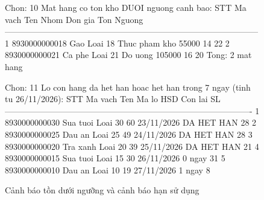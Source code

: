 \begin{figure}[htbp]
\begin{manhinh}
Chon: 10
Mat hang co ton kho DUOI nguong canh bao:
STT  Ma vach        Ten                       Nhom                 Don gia     Ton  Nguong
------------------------------------------------------------------------------------------
1    8930000000018  Gao Loai 18               Thuc pham kho          55000      14      22
2    8930000000021  Ca phe Loai 21            Do uong               105000      16      20
Tong: 2 mat hang

Chon: 11
Lo con hang da het han hoac het han trong 7 ngay (tinh tu 26/11/2026):
STT  Ma vach        Ten                       Ma lo   HSD         Con lai             SL
----------------------------------------------------------------------------------------
1    8930000000030  Sua tuoi Loai 30          60      23/11/2026  DA HET HAN          28
2    8930000000025  Dau an Loai 25            49      24/11/2026  DA HET HAN          28
3    8930000000020  Tra xanh Loai 20          39      25/11/2026  DA HET HAN          21
4    8930000000015  Sua tuoi Loai 15          30      26/11/2026  0 ngay              31
5    8930000000010  Dau an Loai 10            19      27/11/2026  1 ngay               8
\end{manhinh}
\caption{Cảnh báo tồn dưới ngưỡng và cảnh báo hạn sử dụng}
\label{fig:canhbao}
\end{figure}

